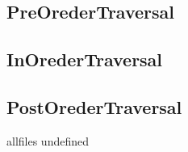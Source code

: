 \documentclass{article}
\begin{document}
\begin{CJK}{UTF8}{gbsn}     %

\else
	
\subsection{PreOrederTraversal}

\subsection{InOrederTraversal}

\subsection{PostOrederTraversal}


\fi

\ifx allfiles undefined
\end{CJK}
\end{document}
